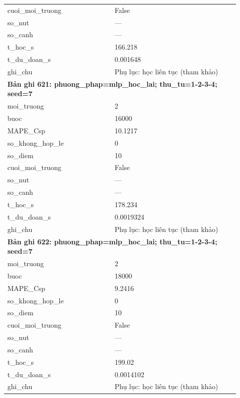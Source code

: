\begin{longtable}{p{0.43\linewidth}p{0.50\linewidth}}
cuoi\_\allowbreak moi\_\allowbreak truong & False \\
so\_\allowbreak nut & — \\
so\_\allowbreak canh & — \\
t\_\allowbreak hoc\_\allowbreak s & 166.218 \\
t\_\allowbreak du\_\allowbreak doan\_\allowbreak s & 0.001648 \\
ghi\_\allowbreak chu & Phụ lục: học liên tục (tham khảo) \\
\midrule
\multicolumn{2}{p{0.95\linewidth}}{\textbf{Bản ghi 621: phuong\_phap=mlp\_hoc\_lai; thu\_tu=1-2-3-4; seed=7}} \\
moi\_\allowbreak truong & 2 \\
buoc & 16000 \\
MAPE\_\allowbreak Csp & 10.1217 \\
so\_\allowbreak khong\_\allowbreak hop\_\allowbreak le & 0 \\
so\_\allowbreak diem & 10 \\
cuoi\_\allowbreak moi\_\allowbreak truong & False \\
so\_\allowbreak nut & — \\
so\_\allowbreak canh & — \\
t\_\allowbreak hoc\_\allowbreak s & 178.234 \\
t\_\allowbreak du\_\allowbreak doan\_\allowbreak s & 0.0019324 \\
ghi\_\allowbreak chu & Phụ lục: học liên tục (tham khảo) \\
\midrule
\multicolumn{2}{p{0.95\linewidth}}{\textbf{Bản ghi 622: phuong\_phap=mlp\_hoc\_lai; thu\_tu=1-2-3-4; seed=7}} \\
moi\_\allowbreak truong & 2 \\
buoc & 18000 \\
MAPE\_\allowbreak Csp & 9.2416 \\
so\_\allowbreak khong\_\allowbreak hop\_\allowbreak le & 0 \\
so\_\allowbreak diem & 10 \\
cuoi\_\allowbreak moi\_\allowbreak truong & False \\
so\_\allowbreak nut & — \\
so\_\allowbreak canh & — \\
t\_\allowbreak hoc\_\allowbreak s & 199.02 \\
t\_\allowbreak du\_\allowbreak doan\_\allowbreak s & 0.0014102 \\
ghi\_\allowbreak chu & Phụ lục: học liên tục (tham khảo) \\

\end{longtable}
